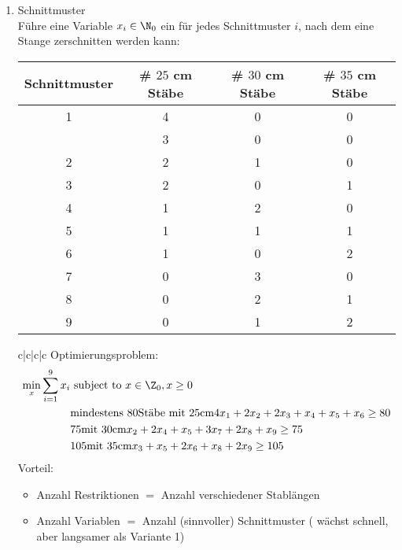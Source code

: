 \begin{beispiel}
\begin{enumerate}
 		\item Schnittmuster\\
     	Führe eine Variable $x_{i} \in \N_{0}$ ein für jedes Schnittmuster $i$, nach dem eine Stange zerschnitten werden kann: 
     	\begin{tabular}{c|c|c|c}
      	Schnittmuster & # $25$ cm Stäbe & # $30$ cm Stäbe & # $35$ cm Stäbe\\
      	\hline
      	1 & 4 & 0 & 0\\
          & 3 & 0 & 0\\
      	2 & 2 & 1 & 0\\
      	3 & 2 & 0 & 1\\
      	4 & 1 & 2 & 0\\
      	5 & 1 & 1 & 1\\
      	6 & 1 & 0 & 2\\
      	7 & 0 & 3 & 0\\
      	8 & 0 & 2 & 1\\
      	9 & 0 & 1 & 2\\
    	\end{tabular}{c|c|c|c}
    	Optimierungsproblem:
    	\begin{align*}
			\min_{x} \sum_{i=1}^{9} x_{i}& \text{ subject to } x \in \Z_{0}, x\geq 0         \\
										 & \text{mindestens } 80 \text{Stäbe mit }25\text{cm} 4x_{1} + 2x_{2} + 2x_{3} + x_{4} + x_{5} + x_{6} \geq 80\\
										 & 75\text{mit } 30 \text{cm} x_{2} + 2x_{4} + x_{5} + 3x_{7} + 2x_{8} + x_{9} \geq 75\\
										 & 105\text{mit } 35 \text{cm} x_{3} + x_{5} + 2x_{6} + x_{8} + 2x_{9} \geq 105\\
    	\end{align*}
		Vorteil: 
		\begin{itemize}
			\item Anzahl Restriktionen $=$ Anzahl verschiedener Stablängen
			\item Anzahl Variablen $=$ Anzahl (sinnvoller) Schnittmuster ( wächst schnell, aber langsamer als Variante 1)
		\end{itemize}
	 

\end{enumerate}
\end{beispiel}
